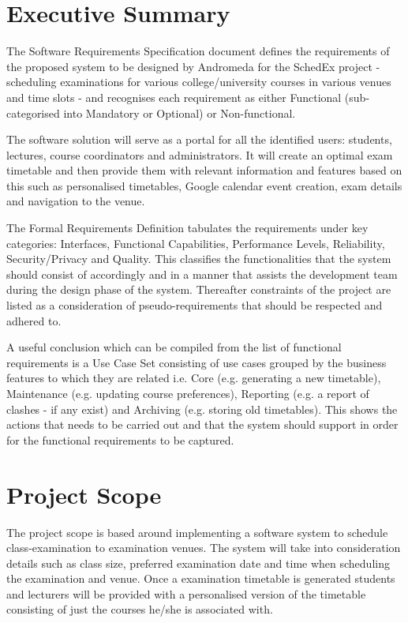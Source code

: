 \documentclass{article}
\begin{document}
\section{Executive Summary}

The Software Requirements Specification document defines the requirements of the proposed system to be designed by Andromeda for the SchedEx project - scheduling examinations for various college/university courses in various venues and time slots - and recognises each requirement as either Functional (sub-categorised into Mandatory or Optional) or Non-functional.

The software solution will serve as a portal for all the identified users: students, lectures, course coordinators and administrators. It will create an optimal exam timetable and then provide them with relevant information and features based on this such as personalised timetables, Google calendar event creation, exam details and navigation to the venue.

The Formal Requirements Definition tabulates the requirements under key categories: Interfaces, Functional Capabilities, Performance Levels, Reliability, Security/Privacy and Quality. This classifies the functionalities that the system should consist of accordingly and in a manner that assists the development team during the design phase of the system. Thereafter constraints of the project are listed as a consideration of pseudo-requirements that should be respected and adhered to.

A useful conclusion which can be compiled from the list of functional requirements is a Use Case Set consisting of use cases grouped by the business features to which they are related i.e. Core (e.g. generating a new timetable), Maintenance (e.g. updating course preferences), Reporting (e.g. a report of clashes - if any exist) and Archiving (e.g. storing old timetables). This shows the actions that needs to be carried out and that the system should support in order for the functional requirements to be captured.

\section{Project Scope}

The project scope is based around implementing a software system to schedule class-examination to examination venues. The system will take into consideration details such as class size, preferred examination date and time when scheduling the examination and venue. Once a examination timetable is generated students and lecturers will be provided with a personalised version of the timetable consisting of just the courses he/she is associated with. 
\end{document}
